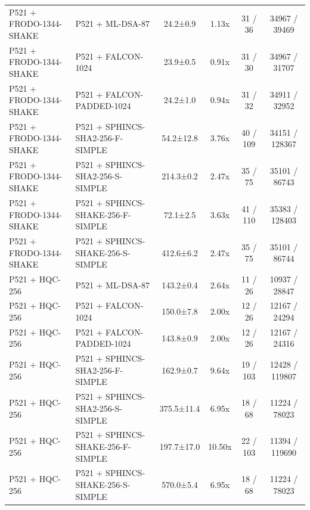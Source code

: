 \documentclass[10pt]{article}
\begin{document}
\begin{tabular}{@{}l l c c c c@{}}
P521 + FRODO-1344-SHAKE & P521 + ML-DSA-87 & 24.2±0.9 & 1.13x & 31 / 36 & 34967 / 39469 \\
P521 + FRODO-1344-SHAKE & P521 + FALCON-1024 & 23.9±0.5 & 0.91x & 31 / 30 & 34967 / 31707 \\
P521 + FRODO-1344-SHAKE & P521 + FALCON-PADDED-1024 & 24.2±1.0 & 0.94x & 31 / 32 & 34911 / 32952 \\
P521 + FRODO-1344-SHAKE & P521 + SPHINCS-SHA2-256-F-SIMPLE & 54.2±12.8 & 3.76x & 40 / 109 & 34151 / 128367 \\
P521 + FRODO-1344-SHAKE & P521 + SPHINCS-SHA2-256-S-SIMPLE & 214.3±0.2 & 2.47x & 35 / 75 & 35101 / 86743 \\
P521 + FRODO-1344-SHAKE & P521 + SPHINCS-SHAKE-256-F-SIMPLE & 72.1±2.5 & 3.63x & 41 / 110 & 35383 / 128403 \\
P521 + FRODO-1344-SHAKE & P521 + SPHINCS-SHAKE-256-S-SIMPLE & 412.6±6.2 & 2.47x & 35 / 75 & 35101 / 86744 \\
P521 + HQC-256 & P521 + ML-DSA-87 & 143.2±0.4 & 2.64x & 11 / 26 & 10937 / 28847 \\
P521 + HQC-256 & P521 + FALCON-1024 & 150.0±7.8 & 2.00x & 12 / 26 & 12167 / 24294 \\
P521 + HQC-256 & P521 + FALCON-PADDED-1024 & 143.8±0.9 & 2.00x & 12 / 26 & 12167 / 24316 \\
P521 + HQC-256 & P521 + SPHINCS-SHA2-256-F-SIMPLE & 162.9±0.7 & 9.64x & 19 / 103 & 12428 / 119807 \\
P521 + HQC-256 & P521 + SPHINCS-SHA2-256-S-SIMPLE & 375.5±11.4 & 6.95x & 18 / 68 & 11224 / 78023 \\
P521 + HQC-256 & P521 + SPHINCS-SHAKE-256-F-SIMPLE & 197.7±17.0 & 10.50x & 22 / 103 & 11394 / 119690 \\
P521 + HQC-256 & P521 + SPHINCS-SHAKE-256-S-SIMPLE & 570.0±5.4 & 6.95x & 18 / 68 & 11224 / 78023 \\
\bottomrule
\end{tabular}
\end{document}
